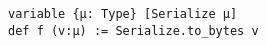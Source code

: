 \begin{lstlisting}[language=lean]
variable {μ: Type} [Serialize μ]
def f (v:μ) := Serialize.to_bytes v
\end{lstlisting}
